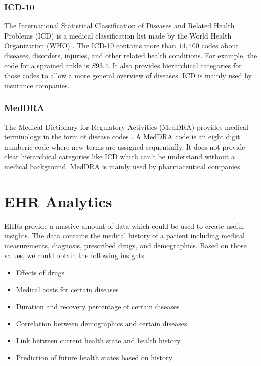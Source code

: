 \subsubsection{ICD-10}

The International Statistical Classification of Diseases and Related Health Problems (ICD) is a medical classification list made by the World Health Organization (WHO) \cite{WHO_ICD:online}. The ICD-10 contains more than $14,400$ codes about diseases, disorders, injuries, and other related health conditions. For example, the code for a sprained ankle is $S93.4$. It also provides hierarchical categories for those codes to allow a more general overview of diseases. ICD is mainly used by insurance companies.


\subsubsection{MedDRA}

The Medical Dictionary for Regulatory Activities (MedDRA) provides medical terminology in the form of disease codes \cite{MedDRA:online}. A MedDRA code is an eight digit numberic code where new terms are assigned sequentially. It does not provide clear hierarchical categories like ICD which can't be understand without a medical background. MedDRA is mainly used by pharmaceutical companies.

\section{EHR Analytics}

EHRs provide a massive amount of data which could be used to create useful insights. The data contains the medical history of a patient including medical measurements, diagnosis, prescribed drugs, and demographics. Based on those values, we could obtain the following insights:

\begin{itemize}

\item Effects of drugs
\item Medical costs for certain diseases
\item Duration and recovery percentage of certain diseases
\item Correlation between demographics and certain diseases
\item Link between current health state and health history
\item Prediction of future health states based on history

\end{itemize}

